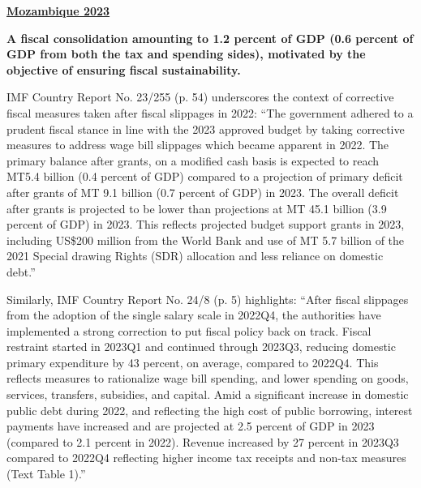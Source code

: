 \textbf{\underline{Mozambique 2023}}

\textbf{A fiscal consolidation amounting to 1.2 percent of GDP (0.6 percent of GDP from both the tax and spending sides), motivated by the objective of ensuring fiscal sustainability.}

IMF Country Report No. 23/255 (p. 54) underscores the context of corrective fiscal measures taken after fiscal slippages in 2022: “The government adhered to a prudent fiscal stance in line with the 2023 approved budget by taking corrective measures to address wage bill slippages which became apparent in 2022. The primary balance after grants, on a modified cash basis is expected to reach MT5.4 billion (0.4 percent of GDP) compared to a projection of primary deficit after grants of MT 9.1 billion (0.7 percent of GDP) in 2023. The overall deficit after grants is projected to be lower than projections at MT 45.1 billion (3.9 percent of GDP) in 2023. This reflects projected budget support grants in 2023, including US\$200 million from the World Bank and use of MT 5.7 billion of the 2021 Special drawing Rights (SDR) allocation and less reliance on domestic debt.”

Similarly, IMF Country Report No. 24/8 (p. 5) highlights: “After fiscal slippages from the adoption of the single salary scale in 2022Q4, the authorities have implemented a strong correction to put fiscal policy back on track. Fiscal restraint started in 2023Q1 and continued through 2023Q3, reducing domestic primary expenditure by 43 percent, on average, compared to 2022Q4. This reflects measures to rationalize wage bill spending, and lower spending on goods, services, transfers, subsidies, and capital. Amid a significant increase in domestic public debt during 2022, and reflecting the high cost of public borrowing, interest payments have increased and are projected at 2.5 percent of GDP in 2023 (compared to 2.1 percent in 2022). Revenue increased by 27 percent in 2023Q3 compared to 2022Q4 reflecting higher income tax receipts and non-tax measures (Text Table 1).”

